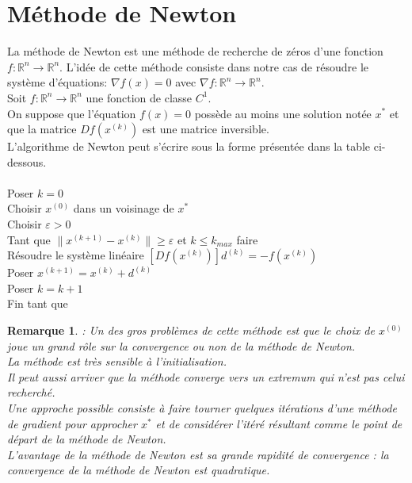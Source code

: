 \documentclass[12pt,a4paper,openay]{book}
\numberwithin{equation}{chapter}
\newtheorem{rmq}{Remarque}[chapter]
\newcommand{\R}{\mathbb{R}}
\newcommand{\xk}{x^{(k)}}
\newcommand{\xks}{x^{(k+1)}}
\begin{document}
	\section{M\'ethode de Newton}
		La m\'ethode de Newton est une m\'ethode de recherche de z\'eros d'une fonction $f:\R^n\to\R^n$.
		L'id\'ee de cette m\'ethode consiste dans notre cas de r\'esoudre le syst\`eme d'\'equations:
		$\nabla f\left(x\right) = 0$ avec $\nabla f:\R^n\to\R^n$.\\
		Soit $f:\R^n\to\R^n$ une fonction de classe $C^1$.\\
		On suppose que l'\'equation $f(x)=0$ poss\`ede au moins une solution not\'ee $x^*$ et que la matrice $Df\left(\xk\right)$ est une matrice inversible.\\
		L'algorithme de Newton peut s'\'ecrire sous la forme pr\'esent\'ee  dans la table ci-dessous.\\	\\	
    		Poser $k=0$\\
    		Choisir $x^{(0)}$ dans un voisinage de $x^*$\\
    		Choisir $\varepsilon >0$\\
    		Tant que $\|\xks-\xk\|\geq\varepsilon$ et $k\leq k_{max}$ faire \\
    		R\'esoudre le syst\`eme lin\'eaire $[Df\left(\xk\right)]d^{(k)} =- f\left(\xk\right)$\\
    		Poser $\xks = \xk + d^{(k)}$\\
    		Poser $k=k+1$\\
    		Fin tant que
    		
	    \begin{rmq}
	    	: Un des gros probl\`emes de cette m\'ethode est que le choix de $x^{(0)}$ joue un grand rôle sur la convergence ou non de la m\'ethode de Newton.\\
	    	La m\'ethode est tr\`es sensible \`a l'initialisation.\\
	    	Il peut aussi arriver que la m\'ethode converge vers un extremum qui n'est pas celui recherch\'e.\\
	    	Une approche possible consiste \`a faire tourner quelques it\'erations d'une m\'ethode de gradient pour approcher $x^*$ et de consid\'erer l'it\'er\'e r\'esultant comme le point de d\'epart de la m\'ethode de Newton.\\
	    	L'avantage de la m\'ethode de Newton est sa grande rapidit\'e de convergence : la 
	    	convergence de la m\'ethode de Newton est quadratique.
	    \end{rmq}
	
\end{document}
